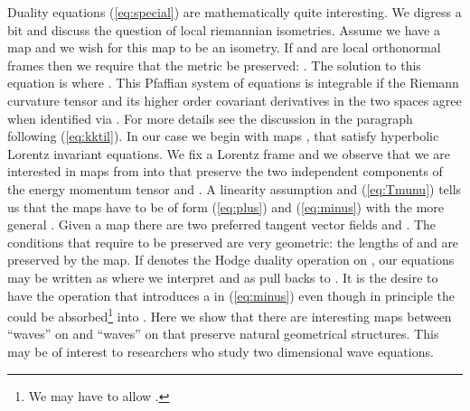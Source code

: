 \documentclass[a4paper,12pt]{article}
\DeclareMathOperator{\Orth}{O}
\providecommand{\hodge}{*_{\Sigma}}
\providecommand{\Mtil}{\widetilde{M}}
\providecommand{\omegatil}{\tilde{\omega}}
\providecommand{\xtil}{\tilde{x}}
\begin{document}
Duality equations (\ref{eq:special}) are mathematically quite
interesting.  We digress a bit and discuss the question of local
riemannian isometries.  Assume we have a map \myHighlight{$f:M\to\Mtil$}\coordHE{} and we wish
for this map to be an isometry.  If \coordHE{} and
\myHighlight{$\{\omegatil^{i}\}$}\coordHE{} are local orthonormal frames then we require that
the metric be preserved: \myHighlight{$f^{*}(\omegatil^{i}\otimes\omegatil^{i}) =
\omega^{j}\otimes\omega^{j}$}\coordHE{}.  The solution to this equation is
\myHighlight{$f^{*}\omegatil = T\omega$}\coordHE{} where \myHighlight{$T:M \to \Orth(n)$}\coordHE{}.  This Pfaffian
system of equations is integrable \cite{BCG3} if the Riemann curvature
tensor and its higher order covariant derivatives in the two spaces
agree when identified via \coordHE{}.  For more details see the discussion in
the paragraph following (\ref{eq:kktil}).  In our case we begin with
maps \coordHE{}, \myHighlight{$\xtil:\Sigma \to \Mtil$}\coordHE{} that satisfy
hyperbolic Lorentz invariant equations.  We fix a Lorentz frame and we
observe that we are interested in maps from \coordHE{} into \myHighlight{$\{\xtil:\Sigma\to\Mtil\,|\, \xtil_{+-}=0\}$}\coordHE{} that
preserve the two independent components of the energy momentum tensor
\myHighlight{$\Theta_{++}$}\coordHE{} and \myHighlight{$\Theta_{--}$}\coordHE{}.  A linearity assumption and
(\ref{eq:Tmunu}) tells us that the maps have to be of form
(\ref{eq:plus}) and (\ref{eq:minus}) with the more general
\coordHE{}.  Given a map \coordHE{} there are two
preferred tangent vector fields \myHighlight{$\partial/\partial\sigma^{+}$}\coordHE{} and
\myHighlight{$\partial/\partial\sigma^{-}$}\coordHE{}.  The conditions that require \myHighlight{$\Theta$}\coordHE{}
to be preserved are very geometric: the lengths of
\myHighlight{$\partial/\partial\sigma^{+}$}\coordHE{} and \myHighlight{$\partial/\partial\sigma^{-}$}\coordHE{} are
preserved by the map.  If \myHighlight{$\hodge$}\coordHE{} denotes the Hodge duality operation
on \myHighlight{$\Sigma$}\coordHE{}, our equations may be written as \myHighlight{$\omegatil = \hodge
(T\omega)$}\coordHE{} where we interpret \myHighlight{$\omega$}\coordHE{} and \myHighlight{$\omegatil$}\coordHE{} as pull backs
to \myHighlight{$\Sigma$}\coordHE{}.  It is the desire to have the \myHighlight{$\hodge$}\coordHE{} operation that
introduces a \coordHE{} in (\ref{eq:minus}) even though in principle the
\coordHE{} could be absorbed\footnote{We may have to allow \myHighlight{$T_{\pm} \in
\Orth(n)$}\coordHE{}.} into \coordHE{}.  Here we show that there are interesting
maps between ``waves'' on \coordHE{} and ``waves'' on \myHighlight{$\Mtil$}\coordHE{} that preserve
natural geometrical structures.  This may be of interest to
researchers who study two dimensional wave equations.
\end{document}

